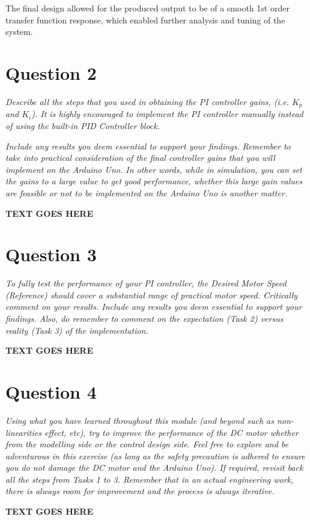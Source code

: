 \documentclass[11pt, onecolumn]{article}
\begin{document}
\par The final design allowed for the produced output to be of a smooth 1st order transfer function response, which enabled further analysis and tuning of the system.
\section*{Question 2}
\par \textit{Describe all the steps that you used in obtaining the PI controller gains, (i.e. $K_p$ and $K_i$). It is highly encouraged to implement the PI controller manually instead of using the built-in PID Controller block.}
\par \textit{Include any results you deem essential to support your findings. Remember to take into practical consideration of the final controller gains that you will implement on the Arduino Uno. In other words, while in simulation, you can set the gains to a large value to get good performance, whether this large gain values are feasible or not to be implemented on the Arduino Uno is another matter.}
\noindent\makebox[\linewidth]{\rule{\textwidth}{0.4pt}}
\par \textbf{TEXT GOES HERE}
\section*{Question 3}
\par \textit{To fully test the performance of your PI controller, the Desired Motor Speed (Reference) should cover a substantial range of practical motor speed. Critically comment on your results. Include any results you deem essential to support your findings. Also, do remember to comment on the expectation (Task 2) versus reality (Task 3) of the implementation.}
\noindent\makebox[\linewidth]{\rule{\textwidth}{0.4pt}}
\par \textbf{TEXT GOES HERE}
\section*{Question 4}
\par \textit{Using what you have learned throughout this module (and beyond such as non- linearities effect, etc), try to improve the performance of the DC motor whether from the modelling side or the control design side. Feel free to explore and be adventurous in this exercise (as long as the safety precaution is adhered to ensure you do not damage the DC motor and the Arduino Uno). If required, revisit back all the steps from Tasks 1 to 3. Remember that in an actual engineering work, there is always room for improvement and the process is always iterative.}
\noindent\makebox[\linewidth]{\rule{\textwidth}{0.4pt}}
\par \textbf{TEXT GOES HERE}
\end{document}
